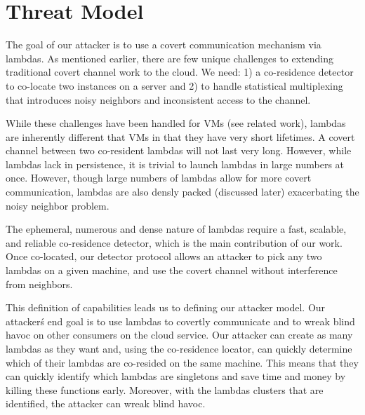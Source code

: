 \section{Threat Model}
\label{sec:attackstrategy}


The goal of our attacker is to use a covert communication mechanism via lambdas.
As mentioned earlier, there are few unique challenges to extending traditional
covert channel work to the cloud. We need: 1) a co-residence detector to
co-locate two instances on a server and 2) to handle statistical multiplexing
that introduces noisy neighbors and inconsistent access to the channel.

While these challenges have been handled for VMs (see related work), lambdas are
inherently different that VMs in that they have very short lifetimes. A covert
channel between two co-resident lambdas will not last very long. However, while
lambdas lack in persistence, it is trivial to launch lambdas in large numbers at
once. However, though large numbers of lambdas allow for more covert communication,
lambdas are also densly packed (discussed later) exacerbating the noisy
neighbor problem.

The ephemeral, numerous and dense nature of lambdas require a fast,
scalable, and reliable co-residence detector, which is the main contribution of
our work. Once co-located, our detector protocol allows an attacker to pick any
two lambdas on a given machine, and use the covert channel without interference
from neighbors.

This definition of capabilities leads us to defining our attacker model.
Our attacker\'s end goal is to use lambdas to covertly communicate and to
wreak blind havoc on other consumers on the cloud service. Our attacker can
create as many lambdas as they want and, using the co-residence locator, can
quickly determine which of their lambdas are co-resided on the same machine.
This means that they can quickly identify which lambdas are singletons and save
time and money by killing these functions early. Moreover, with the lambdas
clusters that are identified, the attacker can wreak blind havoc.
